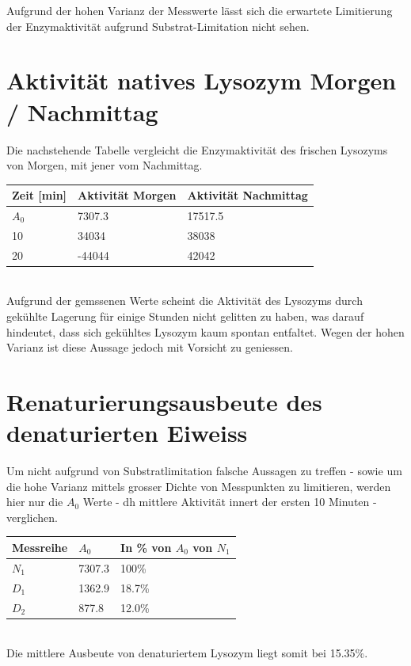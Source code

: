 \documentclass[a4paper,german]{scrreprt}
\begin{document}
Aufgrund der hohen Varianz der Messwerte lässt sich die erwartete Limitierung
der Enzymaktivität aufgrund Substrat-Limitation nicht sehen.

\section{Aktivität natives Lysozym Morgen / Nachmittag}

Die nachstehende Tabelle vergleicht die Enzymaktivität des frischen Lysozyms
von Morgen, mit jener vom Nachmittag.
\\

\begin{tabu}{|l|l|l|}
	\hline
	Zeit [min] & Aktivität Morgen & Aktivität Nachmittag \\
	\hline
	$A_0$ & 7307.3 & 17517.5 \\
	10 & 34034 & 38038 \\ 
	20 & -44044 & 42042 \\ 
	\hline
\end{tabu}
\\

Aufgrund der gemssenen Werte scheint die Aktivität des Lysozyms durch gekühlte
Lagerung für einige Stunden nicht gelitten zu haben, was darauf hindeutet, dass
sich gekühltes Lysozym kaum spontan entfaltet. Wegen der hohen Varianz ist
diese Aussage jedoch mit Vorsicht zu geniessen.

\section{Renaturierungsausbeute des denaturierten Eiweiss}

Um nicht aufgrund von Substratlimitation falsche Aussagen zu treffen - sowie um
die hohe Varianz mittels grosser Dichte von Messpunkten zu limitieren, werden
hier nur die $A_0$ Werte - dh mittlere Aktivität innert der ersten 10 Minuten -
verglichen.
\\

\begin{tabu}{|l|l|l|}
	\hline
	Messreihe & $A_0$ & In \% von $A_0$ von $N_1$ \\
	\hline
	$N_1$ & 7307.3 & 100\% \\
	$D_1$ & 1362.9 & 18.7\% \\
	$D_2$ & 877.8 & 12.0\% \\
	\hline
\end{tabu}
\\

Die mittlere Ausbeute von denaturiertem Lysozym liegt somit bei 15.35\%.
\end{document}
